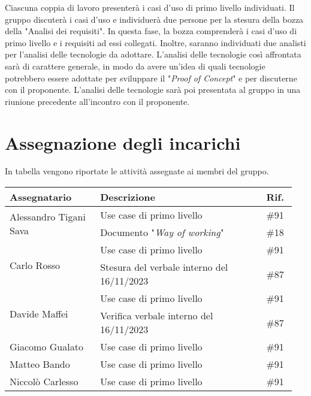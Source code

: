 Ciascuna coppia di lavoro presenterà i casi d'uso di primo livello individuati.
Il gruppo discuterà i casi d'uso e individuerà due persone per la stesura della
bozza della "Analisi dei requisiti". In questa fase, la bozza comprenderà i casi
d'uso di primo livello e i requisiti ad essi collegati. Inoltre,
saranno individuati due analisti per l'analisi delle tecnologie da adottare.
L'analisi delle tecnologie così affrontata sarà di carattere generale, in
modo da avere un'idea di quali tecnologie potrebbero essere adottate
per sviluppare il "\textit{Proof of Concept}" e per discuterne con il
proponente. L'analisi delle tecnologie sarà poi presentata al gruppo in
una riunione precedente all'incontro con il proponente.

\section{Assegnazione degli incarichi}
In tabella vengono riportate le attività assegnate ai membri del gruppo.
\begin{center}
	{
		\renewcommand{\arraystretch}{1.5}
		\begin{tabular}{p{0.30\linewidth}|p{0.55\linewidth}|p{0.10\linewidth}}
			\textbf{Assegnatario}                   & \textbf{Descrizione}                       & \textbf{Rif.} \\
			\hline
			\multirow{2}{*}{Alessandro Tigani Sava} & Use case di primo livello                  & \#91          \\
			\cline{2-3}
			                                        & Documento "\textit{Way of working}"        & \#18          \\
			\hline
			\multirow{2}{*}{Carlo Rosso}            & Use case di primo livello                  & \#91          \\
			\cline{2-3}
			                                        & Stesura del verbale interno del 16/11/2023 & \#87          \\
			\hline
			\multirow{2}{*}{Davide Maffei}          & Use case di primo livello                  & \#91          \\
			\cline{2-3}
			                                        & Verifica verbale interno del 16/11/2023    & \#87          \\
			\hline
			Giacomo Gualato                         & Use case di primo livello                  & \#91          \\
			\hline
			Matteo Bando                            & Use case di primo livello                  & \#91          \\
			\hline
			Niccolò Carlesso                        & Use case di primo livello                  & \#91          \\
			\hline
		\end{tabular}
	}
\end{center}

